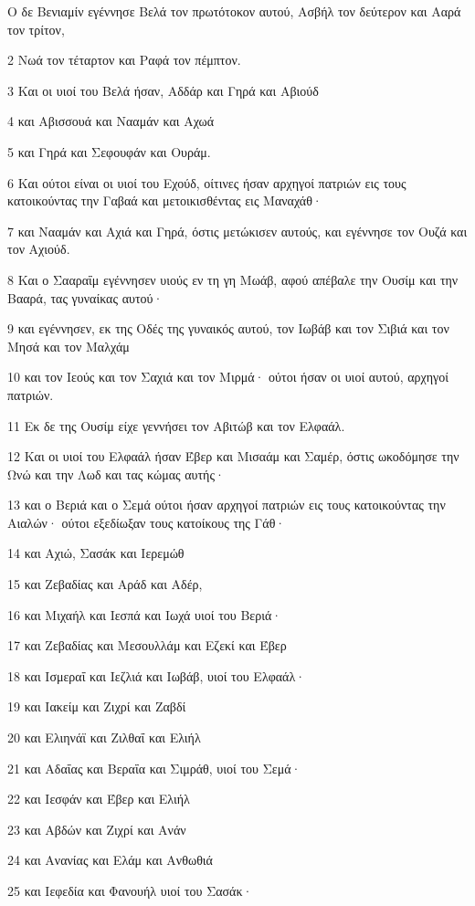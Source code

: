 \par Ο δε Βενιαμίν εγέννησε Βελά τον πρωτότοκον αυτού, Ασβήλ τον δεύτερον και Ααρά τον τρίτον,
\par 2 Νωά τον τέταρτον και Ραφά τον πέμπτον.
\par 3 Και οι υιοί του Βελά ήσαν, Αδδάρ και Γηρά και Αβιούδ
\par 4 και Αβισσουά και Νααμάν και Αχωά
\par 5 και Γηρά και Σεφουφάν και Ουράμ.
\par 6 Και ούτοι είναι οι υιοί του Εχούδ, οίτινες ήσαν αρχηγοί πατριών εις τους κατοικούντας την Γαβαά και μετοικισθέντας εις Μαναχάθ·
\par 7 και Νααμάν και Αχιά και Γηρά, όστις μετώκισεν αυτούς, και εγέννησε τον Ουζά και τον Αχιούδ.
\par 8 Και ο Σααραΐμ εγέννησεν υιούς εν τη γη Μωάβ, αφού απέβαλε την Ουσίμ και την Βααρά, τας γυναίκας αυτού·
\par 9 και εγέννησεν, εκ της Οδές της γυναικός αυτού, τον Ιωβάβ και τον Σιβιά και τον Μησά και τον Μαλχάμ
\par 10 και τον Ιεούς και τον Σαχιά και τον Μιρμά· ούτοι ήσαν οι υιοί αυτού, αρχηγοί πατριών.
\par 11 Εκ δε της Ουσίμ είχε γεννήσει τον Αβιτώβ και τον Ελφαάλ.
\par 12 Και οι υιοί του Ελφαάλ ήσαν Έβερ και Μισαάμ και Σαμέρ, όστις ωκοδόμησε την Ωνώ και την Λωδ και τας κώμας αυτής·
\par 13 και ο Βεριά και ο Σεμά ούτοι ήσαν αρχηγοί πατριών εις τους κατοικούντας την Αιαλών· ούτοι εξεδίωξαν τους κατοίκους της Γάθ·
\par 14 και Αχιώ, Σασάκ και Ιερεμώθ
\par 15 και Ζεβαδίας και Αράδ και Αδέρ,
\par 16 και Μιχαήλ και Ιεσπά και Ιωχά υιοί του Βεριά·
\par 17 και Ζεβαδίας και Μεσουλλάμ και Εζεκί και Έβερ
\par 18 και Ισμεραΐ και Ιεζλιά και Ιωβάβ, υιοί του Ελφαάλ·
\par 19 και Ιακείμ και Ζιχρί και Ζαβδί
\par 20 και Ελιηνάϊ και Ζιλθαΐ και Ελιήλ
\par 21 και Αδαΐας και Βεραΐα και Σιμράθ, υιοί του Σεμά·
\par 22 και Ιεσφάν και Έβερ και Ελιήλ
\par 23 και Αβδών και Ζιχρί και Ανάν
\par 24 και Ανανίας και Ελάμ και Ανθωθιά
\par 25 και Ιεφεδία και Φανουήλ υιοί του Σασάκ·
